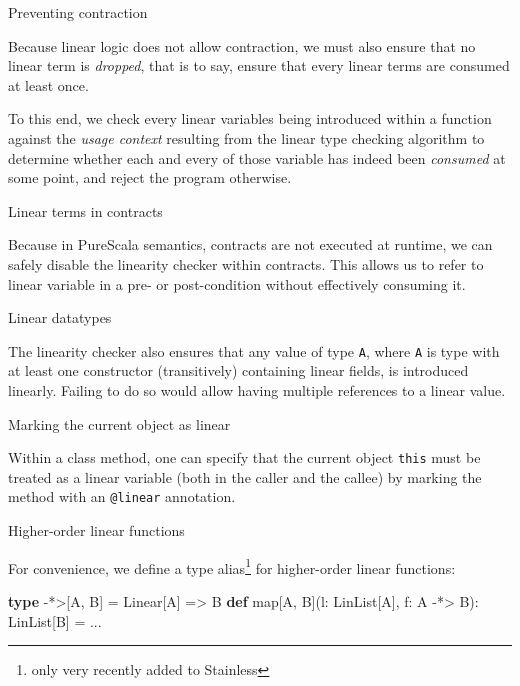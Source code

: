 \documentclass[ignorenonframetext,]{beamer}
\newenvironment{Shaded}{}{}
\newcommand{\KeywordTok}[1]{\textcolor[rgb]{0.00,0.44,0.13}{\textbf{#1}}}
\newcommand{\NormalTok}[1]{#1}
\begin{document}
\begin{frame}{%
\protect\hypertarget{preventing-contraction}{%
Preventing contraction}}

Because linear logic does not allow contraction, we must also ensure
that no linear term is \emph{dropped}, that is to say, ensure that every
linear terms are consumed at least once.

To this end, we check every linear variables being introduced within a
function against the \textit{usage context} resulting from the linear
type checking algorithm to determine whether each and every of those
variable has indeed been \textit{consumed} at some point, and reject the
program otherwise.

\end{frame}

\begin{frame}{%
\protect\hypertarget{linear-terms-in-contracts}{%
Linear terms in contracts}}

Because in PureScala semantics, contracts are not executed at runtime,
we can safely disable the linearity checker within contracts. This
allows us to refer to linear variable in a pre- or post-condition
without effectively consuming it.

\end{frame}

\begin{frame}[fragile]{%
\protect\hypertarget{linear-datatypes}{%
Linear datatypes}}

The linearity checker also ensures that any value of type \texttt{A},
where \texttt{A} is type with at least one constructor (transitively)
containing linear fields, is introduced linearly. Failing to do so would
allow having multiple references to a linear value.

\end{frame}

\begin{frame}[fragile]{%
\protect\hypertarget{marking-the-current-object-as-linear}{%
Marking the current object as linear}}

Within a class method, one can specify that the current object
\texttt{this} must be treated as a linear variable (both in the caller
and the callee) by marking the method with an \texttt{@linear}
annotation.

\end{frame}

\begin{frame}[fragile]{%
\protect\hypertarget{higher-order-linear-functions}{%
Higher-order linear functions}}

For convenience, we define a type
alias\footnote{only very recently added to Stainless} for higher-order
linear functions:

\begin{Shaded}
\begin{Highlighting}[]
\KeywordTok{type}\NormalTok{ -*>[A, B] = Linear[A] => B }
\KeywordTok{def}\NormalTok{ map[A, B](l: LinList[A], f: A -*> B): LinList[B] = ...}
\end{Highlighting}
\end{Shaded}

\end{frame}
\end{document}
